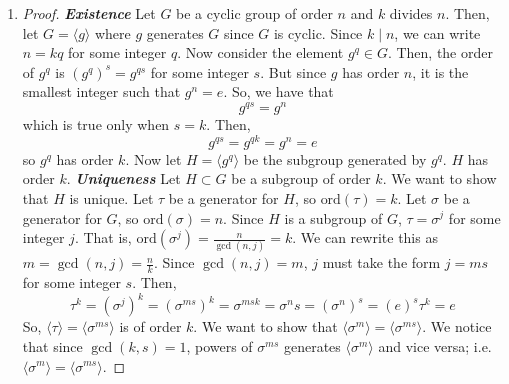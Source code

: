 \documentclass[13pt]{article}
\begin{document}
\begin{enumerate}[label=(\alph*)]
\begin{proof}
            \newline
            We find that the $e^{2 \pi i / n}$ generates $G$:
            \begin{align*}
                e^{2 \pi (0) i / n} &= e^{2 \pi i} = 1 \\
                e^{2 \pi (1) i / n} &= e^{2 \pi i / n} \\
                \vdots \\
                e^{2 \pi (n - 1) i / n} &= e^{2 \pi (n - 1) i / n} \\
            \end{align*}
            so $G$ is cyclic. Since $G$ has $n$ distinct elements, $G$ has order $n$.
        \end{proof}
    \item 
        \begin{proof}
            \textit{\textbf{Existence}}
            \newline
            Let $G$ be a cyclic group of order $n$ and $k$ divides $n$. Then, 
            let $G = \langle g \rangle$ where $g$ generates $G$ since $G$ is cyclic.
            Since $k \mid n$, we can write $n = kq$ for some integer $q$. Now consider 
            the element $g^q \in G$. Then, the order of $g^q$ is 
            $\left(g^q\right)^s = g^{qs}$ for some integer $s$. But since $g$ has order $n$,
            it is the smallest integer such that $g^n = e$. So, we have that
            \[g^{qs} = g^n\]
            which is true only when $s = k$. Then,
            \[g^{qs} = g^{qk} = g^n = e\]
            so $g^q$ has order $k$. Now let $H = \langle g^q \rangle$ be the subgroup
            generated by $g^q$. $H$ has order $k$.
            \newline
            \newline
            \textit{\textbf{Uniqueness}}
            \newline
            Let $H \subset G$ be a subgroup of order $k$. We want to show that $H$ is unique. Let
            $\tau$ be a generator for $H$, so $\text{ord}(\tau) = k$. Let $\sigma$ be a generator
            for $G$, so $\text{ord}(\sigma) = n$. Since $H$ is a subgroup of $G$, $\tau = \sigma^j$
            for some integer $j$. That is, $\text{ord}(\sigma^j) = \frac{n}{\gcd(n, j)} = k$. We can 
            rewrite this as $m = \gcd(n, j) = \frac{n}{k}$. Since $\gcd(n, j) = m$, $j$ must take the 
            form $j = ms$ for some integer $s$. Then, 
            \[
                \tau^k = \left(\sigma^j\right)^k
                = \left(\sigma^{ms}\right)^k
                = \sigma^{msk}
                = \sigma^ns
                = \left(\sigma^n\right)^s
                = \left(e\right)^s
                \tau^k = e
            \]
            So, $\langle \tau \rangle = \langle \sigma^{ms} \rangle$ is of order $k$. We want to 
            show that $\langle \sigma^m \rangle = \langle \sigma^{ms} \rangle$. We notice that since 
            $\gcd(k, s) = 1$, powers of $\sigma^{ms}$ generates $\langle \sigma^m \rangle$ and vice
            versa; i.e. $\langle \sigma^m \rangle = \langle \sigma^{ms} \rangle$.
        \end{proof}
\end{enumerate}
\end{document}
